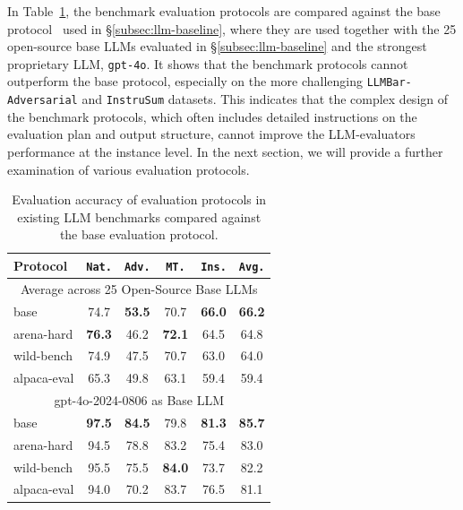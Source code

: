 \documentclass[11pt]{article}
\newcommand{\adversarial}{\texttt{LLMBar-Adversarial}\xspace}
\newcommand{\instrusum}{\texttt{InstruSum}\xspace}
\newcommand{\natshort}{\texttt{Nat.}\xspace}
\newcommand{\advshort}{\texttt{Adv.}\xspace}
\newcommand{\mtshort}{\texttt{MT.}\xspace}
\newcommand{\insshort}{\texttt{Ins.}\xspace}
\begin{document}
In Table~\ref{tab:benchmark-protocol}, the benchmark evaluation protocols are compared against the base protocol~\cite{zeng2024evaluating} used in \S\ref{subsec:llm-baseline}, where they are used together with the 25 open-source base LLMs evaluated in \S\ref{subsec:llm-baseline} and the strongest proprietary LLM, \texttt{gpt-4o}.
It shows that the benchmark protocols cannot outperform the base protocol, especially on the more challenging  \adversarial and \instrusum datasets.
This indicates that the complex design of the benchmark protocols, which often includes detailed instructions on the evaluation plan and output structure, cannot improve the LLM-evaluators performance at the instance level.
In the next section, we will provide a further examination of various evaluation protocols.


\begin{table}[t!]
\small
\centering
\addtolength{\tabcolsep}{+2pt} 
\begin{tabular}{@{}lccccc@{}}
\toprule
\textbf{Protocol} & \textbf{\natshort} & \textbf{\advshort} & \textbf{\mtshort}  & \textbf{\insshort} & \textbf{\texttt{Avg.}}\\
\midrule
\multicolumn{6}{c}{Average across 25 Open-Source Base LLMs} \\
\midrule
base       & 74.7             & \textbf{53.5}        & 70.7          & \textbf{66.0}   & \textbf{66.2} \\
 arena-hard & \textbf{76.3}    & 46.2                 & \textbf{72.1} & 64.5            & 64.8          \\
 wild-bench  & 74.9             & 47.5                 & 70.7          & 63.0            & 64.0          \\
 alpaca-eval & 65.3             & 49.8                 & 63.1          & 59.4            & 59.4          \\
\midrule
\multicolumn{6}{c}{gpt-4o-2024-0806 as Base LLM} \\
\midrule
base       & \textbf{97.5}    & \textbf{84.5}        & 79.8          & \textbf{81.3}   & \textbf{85.7} \\
 arena-hard & 94.5             & 78.8                 & 83.2          & 75.4            & 83.0          \\
 wild-bench  & 95.5             & 75.5                 & \textbf{84.0} & 73.7            & 82.2          \\
 alpaca-eval & 94.0             & 70.2                 & 83.7          & 76.5            & 81.1          \\
\bottomrule
\end{tabular}
\addtolength{\tabcolsep}{-2pt} 
\caption{Evaluation accuracy of evaluation protocols in existing LLM benchmarks compared against the base evaluation protocol.  
% 
}
\label{tab:benchmark-protocol} 
\end{table}
\end{document}
